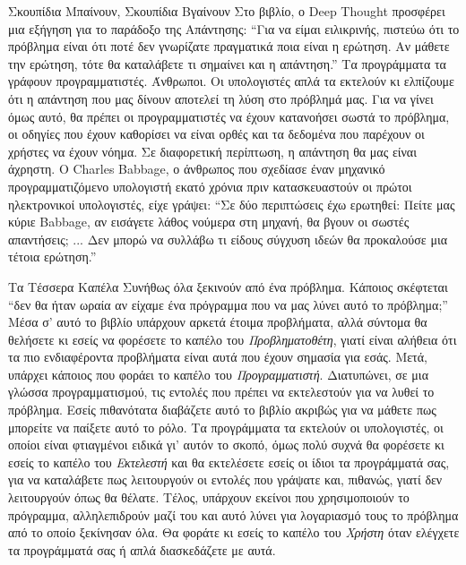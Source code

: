 \documentclass[a4paper,11pt,oneside]{book}
\begin{document}
\begin{theory}{Σκουπίδια Μπαίνουν, Σκουπίδια Βγαίνουν}
Στο βιβλίο, ο Deep Thought προσφέρει μια εξήγηση για το παράδοξο της Απάντησης: ``Για να είμαι ειλικρινής, πιστεύω ότι το πρόβλημα είναι ότι ποτέ δεν γνωρίζατε πραγματικά ποια είναι η ερώτηση. Αν μάθετε την ερώτηση, τότε θα καταλάβετε τι σημαίνει και η απάντηση.'' Τα προγράμματα τα γράφουν προγραμματιστές. Άνθρωποι. Οι υπολογιστές απλά τα εκτελούν κι ελπίζουμε ότι η απάντηση που μας δίνουν αποτελεί τη λύση στο πρόβλημά μας. Για να γίνει όμως αυτό, θα πρέπει οι προγραμματιστές να έχουν κατανοήσει σωστά το πρόβλημα, οι οδηγίες που έχουν καθορίσει να είναι ορθές και τα δεδομένα που παρέχουν οι χρήστες να έχουν νόημα. Σε διαφορετική περίπτωση, η απάντηση θα μας είναι άχρηστη. Ο Charles Babbage, ο άνθρωπος που σχεδίασε έναν μηχανικό προγραμματιζόμενο υπολογιστή εκατό χρόνια πριν κατασκευαστούν οι πρώτοι ηλεκτρονικοί υπολογιστές, είχε γράψει: ``Σε δύο περιπτώσεις έχω ερωτηθεί: Πείτε μας κύριε Babbage, αν εισάγετε λάθος νούμερα στη μηχανή, θα βγουν οι σωστές απαντήσεις; ... Δεν μπορώ να συλλάβω τι είδους σύγχυση ιδεών θα προκαλούσε μια τέτοια ερώτηση.''
\end{theory}

\begin{theory}{Τα Τέσσερα Καπέλα}
Συνήθως όλα ξεκινούν από ένα πρόβλημα. Κάποιος σκέφτεται ``δεν θα ήταν ωραία αν είχαμε ένα πρόγραμμα που να μας λύνει αυτό το πρόβλημα;'' Μέσα σ' αυτό το βιβλίο υπάρχουν αρκετά έτοιμα προβλήματα, αλλά σύντομα θα θελήσετε κι εσείς να φορέσετε το καπέλο του \emph{Προβληματοθέτη}, γιατί είναι αλήθεια ότι τα πιο ενδιαφέροντα προβλήματα είναι αυτά που έχουν σημασία για εσάς.
Μετά, υπάρχει κάποιος που φοράει το καπέλο του \emph{Προγραμματιστή}. Διατυπώνει, σε μια γλώσσα προγραμματισμού, τις εντολές που πρέπει να εκτελεστούν για να λυθεί το πρόβλημα. Εσείς πιθανότατα διαβάζετε αυτό το βιβλίο ακριβώς για να μάθετε πως μπορείτε να παίξετε αυτό το ρόλο. Tα προγράμματα τα εκτελούν οι υπολογιστές, οι οποίοι είναι φτιαγμένοι ειδικά γι' αυτόν το σκοπό, όμως πολύ συχνά θα φορέσετε κι εσείς το καπέλο του \emph{Εκτελεστή} και θα εκτελέσετε εσείς οι ίδιοι τα προγράμματά σας, για να καταλάβετε πως λειτουργούν οι εντολές που γράψατε και, πιθανώς, γιατί δεν λειτουργούν όπως θα θέλατε. Τέλος, υπάρχουν εκείνοι που χρησιμοποιούν το πρόγραμμα, αλληλεπιδρούν μαζί του και αυτό λύνει για λογαριασμό τους το πρόβλημα από το οποίο ξεκίνησαν όλα. Θα φοράτε κι εσείς το καπέλο του \emph{Χρήστη} όταν ελέγχετε τα προγράμματά σας ή απλά διασκεδάζετε με αυτά.
\end{theory}


\hrulefill
\end{document}
